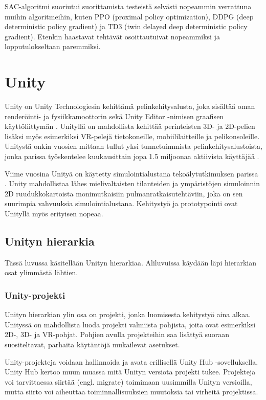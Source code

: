 \documentclass[utf8]{gradu3}
\begin{document}
SAC-algoritmi suoriutui \textcite{haarnoja2018app} suorittamista testeistä selvästi nopeammin verrattuna muihin algoritmeihin, kuten PPO (proximal policy optimization), DDPG (deep deterministic policy gradient) ja TD3 (twin delayed deep deterministic policy gradient). Etenkin haastavat tehtävät osoittautuivat nopeammiksi ja lopputulokseltaan paremmiksi.

\chapter{Unity}
\label{unity}

Unity on Unity Technologiesin kehittämä pelinkehitysalusta, joka sisältää oman renderöinti- ja fysiikkamoottorin sekä Unity Editor -nimisen graafisen käyttöliittymän \parencite{juliani2018unity}. Unityllä on mahdollista kehittää perinteisten 3D- ja 2D-pelien lisäksi myös esimerkiksi VR-pelejä tietokoneille, mobiililaitteille ja pelikonsoleille. Unitystä onkin vuosien mittaan tullut yksi tunnetuimmista pelinkehitysalustoista, jonka parissa työskentelee kuukausittain jopa 1.5 miljoonaa aktiivista käyttäjää \parencite{unityweb}.

Viime vuosina Unityä on käytetty simulointialustana tekoälytutkimuksen parissa \parencite{juliani2018unity}. Unity mahdollistaa lähes mielivaltaisten tilanteiden ja ympäristöjen simuloinnin 2D ruudukkokartoista monimutkaisiin pulmanratkaisutehtäviin, joka on sen suurimpia vahvuuksia simulointialustana. Kehitystyö ja prototypointi ovat Unityllä myös erityisen nopeaa.

\section{Unityn hierarkia}

Tässä luvussa käsitellään Unityn hierarkiaa. Aliluvuissa käydään läpi hierarkian osat ylimmästä lähtien.

\subsection{Unity-projekti}

Unityn hierarkian ylin osa on projekti, jonka luomisesta kehitystyö aina alkaa. Unityssä on mahdollista luoda projekti valmiista pohjista, joita ovat esimerkiksi 2D-, 3D- ja VR-pohjat. Pohjien avulla projekteihin saa lisättyä suoraan suositeltavat, parhaita käytäntöjä mukailevat asetukset.

Unity-projekteja voidaan hallinnoida ja avata erillisellä Unity Hub -sovelluksella. Unity Hub kertoo muun muassa mitä Unityn versiota projekti tukee. Projekteja voi tarvittaessa siirtää (engl. migrate) toimimaan uusimmilla Unityn versioilla, mutta siirto voi aiheuttaa toiminnallisuuksien muutoksia tai virheitä projektissa.
\end{document}
